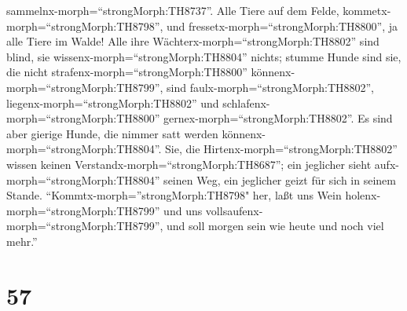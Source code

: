 sammelnx-morph=``strongMorph:TH8737''.  Alle Tiere auf dem
Felde, kommetx-morph=``strongMorph:TH8798'', und
fressetx-morph=``strongMorph:TH8800'', ja alle Tiere im Walde!
 Alle ihre Wächterx-morph=``strongMorph:TH8802'' sind
blind, sie wissenx-morph=``strongMorph:TH8804'' nichts; stumme Hunde
sind sie, die nicht strafenx-morph=``strongMorph:TH8800''
könnenx-morph=``strongMorph:TH8799'', sind
faulx-morph=``strongMorph:TH8802'', liegenx-morph=``strongMorph:TH8802''
und schlafenx-morph=``strongMorph:TH8800''
gernex-morph=``strongMorph:TH8802''.  Es sind aber gierige
Hunde, die nimmer satt werden könnenx-morph=``strongMorph:TH8804''. Sie,
die Hirtenx-morph=``strongMorph:TH8802'' wissen keinen
Verstandx-morph=``strongMorph:TH8687''; ein jeglicher sieht
aufx-morph=``strongMorph:TH8804'' seinen Weg, ein jeglicher geizt für
sich in seinem Stande. 
``Kommtx-morph=''strongMorph:TH8798" her, laßt uns Wein
holenx-morph=``strongMorph:TH8799'' und uns
vollsaufenx-morph=``strongMorph:TH8799'', und soll morgen sein wie heute
und noch viel mehr.''

\hypertarget{section-56}{%
\section{57}\label{section-56}}

